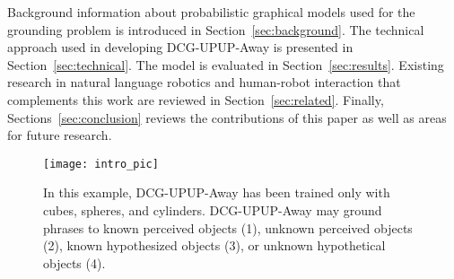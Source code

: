Background information about probabilistic graphical models used for the grounding problem is introduced in Section~\ref{sec:background}.
The technical approach used in developing DCG-UPUP-Away is presented in Section~\ref{sec:technical}.
The model is evaluated in Section~\ref{sec:results}.
Existing research in natural language robotics and human-robot interaction that complements this work are reviewed in Section~\ref{sec:related}.
Finally, Sections~\ref{sec:conclusion} reviews the contributions of this paper as well as areas for future research.
\begin{figure}[t]
	\centering
	\texttt{[image: intro\_pic]}
	\caption{In this example, DCG-UPUP-Away has been trained only with cubes, spheres, and cylinders. DCG-UPUP-Away may ground phrases to known perceived objects (1), unknown perceived objects (2), known hypothesized objects (3), or unknown hypothetical objects (4).}
	\label{fig:intro_pic}
\end{figure}